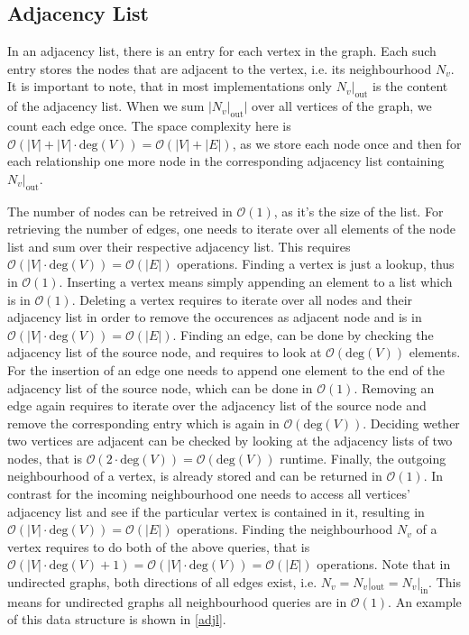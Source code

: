         \subsection*{Adjacency List}
        In an adjacency list, there is an entry for each vertex in the graph. 
        Each such entry stores the nodes that are adjacent to the vertex, i.e. its neighbourhood $N_v$. 
        It is important to note, that in most implementations only $N_v |_\text{out}$ is the content of the adjacency list.
        When we sum $|N_v |_\text{out}|$ over all vertices of the graph, we count each edge once.
        The space complexity here is $\mathcal{O}(|V| + |V| \cdot \text{deg}(V)) = \mathcal{O}(|V| + |E|)$, as we store each node once and then for each relationship one more node in the corresponding adjacency list containing $N_v |_\text{out}$.

        The number of nodes can be retreived in $\mathcal{O}(1)$, as it's the size of the list.
        For retrieving the number of edges, one needs to iterate over all elements of the node list and sum over their respective adjacency list. This requires $\mathcal{O}(|V| \cdot \text{deg}(V)) = \mathcal{O}(|E|)$ operations.
        Finding a vertex is just a lookup, thus in $\mathcal{O}(1)$.
        Inserting a vertex means simply appending an element to a list which is in $\mathcal{O}(1)$.
        Deleting a vertex requires to iterate over all nodes and their adjacency list in order to remove the occurences as adjacent node and is in $\mathcal{O}(|V| \cdot \text{deg}(V)) = \mathcal{O}(|E|)$.
        Finding an edge, can be done by checking the adjacency list of the source node, and requires to look at $\mathcal{O}(\text{deg}(V))$ elements.
        For the insertion of an edge one needs to append one element to the end of the adjacency list of the source node, which can be done in $\mathcal{O}(1)$.
        Removing an edge again requires to iterate over the adjacency list of the source node and remove the corresponding entry which is again in $\mathcal{O}(\text{deg}(V))$.        
        Deciding wether two vertices are adjacent can be checked by looking at the adjacency lists of two nodes, that is $\mathcal{O}(2 \cdot \text{deg}(V)) = \mathcal{O}(\text{deg}(V))$ runtime.        
        Finally, the outgoing neighbourhood of a vertex, is already stored and can be returned in $\mathcal{O}(1)$.
        In contrast for the incoming neighbourhood one needs to access all vertices' adjacency list and see if the particular vertex is contained in it, resulting in $\mathcal{O}(|V| \cdot \text{deg}(V)) = \mathcal{O}(|E|)$ operations.
        Finding the neighbourhood $N_v$ of a vertex requires to do both of the above queries, that is $\mathcal{O}(|V| \cdot \text{deg}(V) + 1) = \mathcal{O}(|V| \cdot \text{deg}(V))  = \mathcal{O}(|E|)$ operations.  
        Note that in undirected graphs, both directions of all edges exist, i.e. $N_v = N_v |_\text{out} = N_v |_\text{in}$. This means for undirected graphs all neighbourhood queries are in $\mathcal{O}(1)$.      
        An example of this data structure is shown in \ref{adjl}.
        

